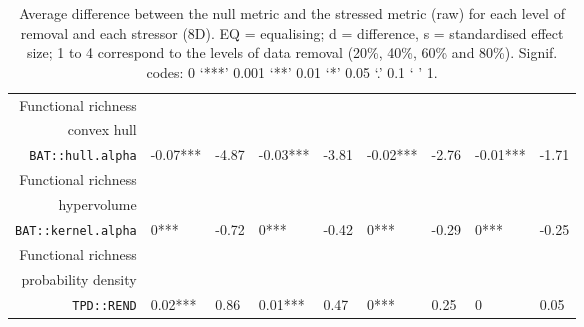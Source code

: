 \begin{table}[ht]
\begin{tabular}{rllllllll}
  Functional richness\\convex hull\\\texttt{BAT::hull.alpha} & -0.07*** & -4.87 & -0.03*** & -3.81 & -0.02*** & -2.76 & -0.01*** & -1.71 \\ 
  Functional richness\\hypervolume\\\texttt{BAT::kernel.alpha} & 0*** & -0.72 & 0*** & -0.42 & 0*** & -0.29 & 0*** & -0.25 \\ 
  Functional richness\\probability density\\\texttt{TPD::REND} & 0.02*** & 0.86 & 0.01*** & 0.47 & 0*** & 0.25 & 0 & 0.05 \\ 
   \hline
\end{tabular}
\caption{Average difference between the null metric and the stressed metric (raw) for each level of removal and each stressor (8D). EQ = equalising; d = difference, s = standardised effect size; 1 to 4 correspond to the levels of data removal (20\%, 40\%, 60\% and 80\%). Signif. codes:  0 ‘***’ 0.001 ‘**’ 0.01 ‘*’ 0.05 ‘.’ 0.1 ‘ ’ 1.} 
\end{table}
